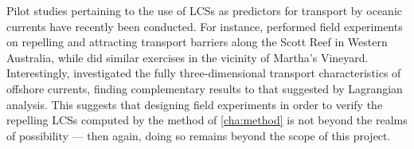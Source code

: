 Pilot studies pertaining to the use of LCSs as predictors for transport by
oceanic currents have recently been conducted. For instance,
\textcite{filippi2018detection} performed field experiments on repelling and
attracting transport barriers along the Scott Reef in Western Australia,
while \textcite{peacock2018targeted} did similar exercises in the vicinity of
Martha's Vineyard. Interestingly, \citeauthor{peacock2018targeted} investigated
the fully three-dimensional transport characteristics of offshore currents,
finding complementary results to that suggested by Lagrangian analysis. This
suggests that designing field experiments in order to verify the repelling LCSs
computed by the method of \cref{cha:method} is not beyond the realms of
possibility --- then again, doing so remains beyond the scope of this project.


